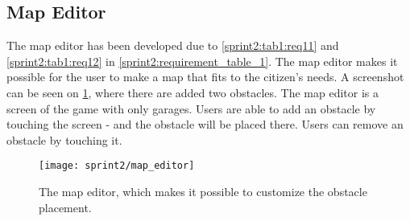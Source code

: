 \subsection{Map Editor}\label{sprint2:map_editor}
The map editor has been developed due to \cref{sprint2:tab1:req11} and \cref{sprint2:tab1:req12} in \cref{sprint2:requirement_table_1}.
The map editor makes it possible for the user to make a map that fits to the citizen's needs.
A screenshot can be seen on \cref{fig:sprint2:map_editor}, where there are added two obstacles.
The map editor is a screen of the game with only garages.
Users are able to add an obstacle by touching the screen - and the obstacle will be placed there.
Users can remove an obstacle by touching it.

\begin{figure}[h]
\texttt{[image: sprint2/map\_editor]}
\caption{The map editor, which makes it possible to customize the obstacle placement.}
\label{fig:sprint2:map_editor}
\end{figure}
 
